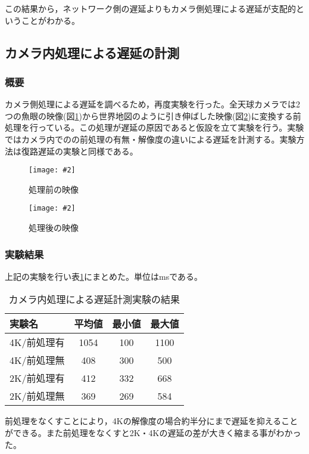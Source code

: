 \documentclass[a4paper,12pt]{jsarticle}
\newcommand{\figuref}[1]{図\ref{#1}}
\newcommand{\tabref}[1]{表\ref{#1}}
\newcommand{\fig}[4][width=\textwidth]{
    \begin{figure}[!h]
    \begin{center}
    \texttt{[image: \#2]}
    \caption{#3}
    \label{#4}
    \vspace*{-1cm}
    \end{center}
    \end{figure}
}
\begin{document}
この結果から，ネットワーク側の遅延よりもカメラ側処理による遅延が支配的ということがわかる。
\clearpage

\subsection{カメラ内処理による遅延の計測}
\subsubsection{概要}
カメラ側処理による遅延を調べるため，再度実験を行った。全天球カメラでは2つの魚眼の映像(\figuref{theta_dualfisheye})から世界地図のように引き伸ばした映像(\figuref{theta_equirectangular})に変換する前処理を行っている。この処理が遅延の原因であると仮設を立て実験を行う。実験ではカメラ内でのの前処理の有無・解像度の違いによる遅延を計測する。実験方法は復路遅延の実験と同様である。
\fig[width=7cm]{image/theta_dualfisheye.jpg}{処理前の映像}{theta_dualfisheye}
\fig[width=7cm]{image/theta_equirectangular.jpg}{処理後の映像}{theta_equirectangular}
\clearpage

\subsubsection{実験結果}
上記の実験を行い\tabref{camera_table}にまとめた。単位はmsである。

\begin{table}[htb]
\begin{center}
\caption{カメラ内処理による遅延計測実験の結果}
\label{camera_table}
\begin{tabular}{l|c|c|c}
実験名 & 平均値 & 最小値 & 最大値 \\ \hline
4K/前処理有 & 1054 & 100 & 1100 \\
4K/前処理無 & 408 & 300 & 500 \\
2K/前処理有 & 412 & 332 & 668 \\
2K/前処理無 & 369 & 269 & 584 \\
\end{tabular}
\end{center}
\end{table}

前処理をなくすことにより，4Kの解像度の場合約半分にまで遅延を抑えることができる。また前処理をなくすと2K・4Kの遅延の差が大きく縮まる事がわかった。
\clearpage
\end{document}
